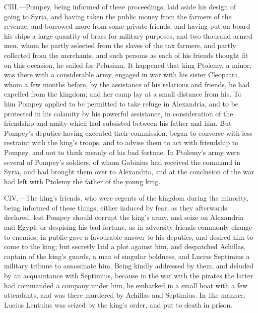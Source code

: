 CIII.—Pompey, being informed of these proceedings, laid aside his
design of going to Syria, and having taken the public money from the
farmers of the revenue, and borrowed more from some private friends, and
having put on board his ships a large quantity of brass for military
purposes, and two thousand armed men, whom he partly selected from the
slaves of the tax farmers, and partly collected from the merchants, and
such persons as each of his friends thought fit on this occasion, he
sailed for Pelusium. It happened that king Ptolemy, a minor, was there
with a considerable army, engaged in war with his sister Cleopatra, whom
a few months before, by the assistance of his relations and friends, he
had expelled from the kingdom; and her camp lay at a small distance from
his. To him Pompey applied to be permitted to take refuge in Alexandria,
and to be protected in his calamity by his powerful assistance, in
consideration of the friendship and amity which had subsisted between
his father and him. But Pompey's deputies having executed their
commission, began to converse with less restraint with the king's
troops, and to advise them to act with friendship to Pompey, and not to
think meanly of his bad fortune. In Ptolemy's army were several of
Pompey's soldiers, of whom Gabinius had received the command in Syria,
and had brought them over to Alexandria, and at the conclusion of the
war had left with Ptolemy the father of the young king.

CIV.—The king's friends, who were regents of the kingdom during the
minority, being informed of these things, either induced by fear, as
they afterwards declared, lest Pompey should corrupt the king's army,
and seize on Alexandria and Egypt; or despising his bad fortune, as in
adversity friends commonly change to enemies, in public gave a
favourable answer to his deputies, and desired him to come to the king;
but secretly laid a plot against him, and despatched Achillas, captain
of the king's guards, a man of singular boldness, and Lucius Septimius a
military tribune to assassinate him. Being kindly addressed by them, and
deluded by an acquaintance with Septimius, because in the war with the
pirates the latter had commanded a company under him, he embarked in a
small boat with a few attendants, and was there murdered by Achillas and
Septimius. In like manner, Lucius Lentulus was seized by the king's
order, and put to death in prison.

